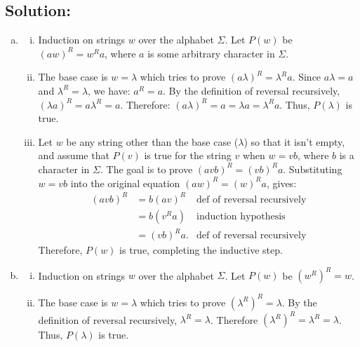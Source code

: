 \documentclass[12pt]{article}
\begin{document}
	\subsection*{\textbf{Solution:}}
	\begin{enumerate}[(a)]
		\item
			\begin{enumerate}[(i)]
				\item Induction on strings $w$ over the alphabet $\Sigma$. Let $P(w)$ be
					$(aw)^{R}=w^{R} a$, where $a$ is some arbitrary character in $\Sigma$.

				\item The base case is $w=\lambda$ which tries to prove $(a\lambda)^{R}=\lambda
					^{R} a$. Since $a\lambda=a$ and $\lambda^{R}=\lambda$, we have:
					$a^{R}=a$. By the definition of reversal recursively,
					$(\lambda a)^{R}=a\lambda^{R}=a$. Therefore:
					$(a\lambda)^{R}=a=\lambda a=\lambda^{R} a$. Thus, $P(\lambda)$ is true.

				\item Let $w$ be any string other than the base case ($\lambda$) so that
					it isn't empty, and assume that $P(v)$ is true for the string $v$ when
					$w=vb$, where $b$ is a character in $\Sigma$. The goal is to prove
					$(avb)^{R}=(vb)^{R} a$. Substituting $w=vb$ into the original equation
					$(aw)^{R}=(w)^{R} a$, gives:
					\begin{align*}
						(avb)^{R} & = b(av)^{R}   & \text{def of reversal recursively} \\
						          & = b(v^{R} a)  & \text{induction hypothesis}        \\
						          & = (vb)^{R} a. & \text{def of reversal recursively}
					\end{align*}
					Therefore, $P(w)$ is true, completing the inductive step.
			\end{enumerate}

		\item
			\begin{enumerate}[(i)]
				\item Induction on strings $w$ over the alphabet $\Sigma$. Let $P(w)$ be
					$(w^{R})^{R}=w$.

				\item The base case is $w=\lambda$ which tries to prove $(\lambda^{R})^{R}
					=\lambda$. By the definition of reversal recursively, $\lambda^{R}=\lambda$.
					Therefore $(\lambda^{R})^{R}=\lambda^{R}=\lambda$. Thus, $P(\lambda)$
					is true.


\end{enumerate}
\end{enumerate}
\end{document}
